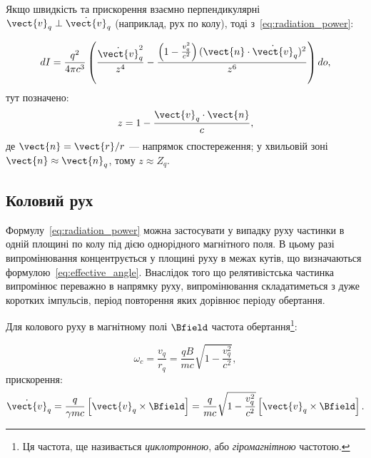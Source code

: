 Якщо швидкість та прискорення взаємно перпендикулярні \( \vect{v}_q \perp \dot{\vect{v}}_q \) (наприклад, рух по колу),
тоді з~\eqref{eq:radiation_power}:


\begin{equation}\label{eq:4.1.14}
	dI = \frac{q^2}{4\pi c^3} \left( \frac{\dot{\vect{v}}_q^2}{z^4} - \frac{\left(1 - \frac{v_q^2}{c^2}\right) (\vect{n} \cdot \dot{\vect{v}}_q)^2}{z^6}
		\right) do,
\end{equation}
тут позначено:
\begin{equation*}
	z = 1 - \frac{\vect{v}_q \cdot \vect{n}}{c},
\end{equation*}
%
де $\vect{n} = \vect{r}/r$ --- напрямок спостереження; у хвильовій зоні $\vect{n} \approx \vect{n}_q$, тому $z \approx
Z_q$.

\subsection*{Коловий рух}

Формулу~\eqref{eq:radiation_power} можна застосувати у випадку руху частинки в одній площині по колу під дією однорідного
магнітного поля. В цьому разі випромінювання концентрується у площині руху в межах кутів, що визначаються
формулою~\eqref{eq:effective_angle}. Внаслідок того що релятивістська частинка випромінює переважно в напрямку руху,
випромінювання складатиметься з дуже коротких імпульсів, період повторення яких дорівнює періоду обертання.

Для колового руху в магнітному полі \( \Bfield \) частота обертання\footnote{Ця частота, ще називається
\emph{циклотронною}, або \emph{гіромагнітною} частотою.}:

\begin{equation*}
	\omega_c = \frac{v_q}{r_q} = \frac{qB}{m c}\sqrt{1 - \frac{v_q^2}{c^2}},
\end{equation*}
прискорення:
\begin{equation*}
    \dot{\vect{v}}_q = \frac{q}{\gamma mc}\left[\vect{v}_q\times\Bfield\right]
= \frac{q}{mc}\sqrt{1 - \frac{v_q^2}{c^2}}\left[\vect{v}_q\times\Bfield\right].
\end{equation*}



